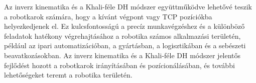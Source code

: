 Az inverz kinematika és a Khali-féle DH módszer együttműködve lehetővé teszik a robotkarok számára, hogy a kívánt végpont vagy TCP pozíciókba helyezkedjenek el. Ez kulcsfontosságú a precíz munkavégzéshez és a különböző feladatok hatékony végrehajtásához a robotika számos alkalmazási területén, például az ipari automatizációban, a gyártásban, a logisztikában és a sebészeti beavatkozásokban. Az inverz kinematika és a Khali-féle DH módszer jelentős fejlődést hozott a robotkarok irányításában és pozícionálásában, és további lehetőségeket teremt a robotika területén.